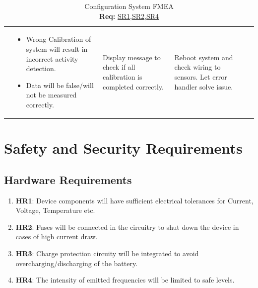 \documentclass{article}
\begin{document}
\begin{table}[H]
\begin{tabular}{|p{3em}|p{5em}|p{7em}|p{8em}|p{6em}|p{7em}|}
		 & \begin{itemize}[nosep, wide=0pt, leftmargin=*, after=\strut]
			   \item Wrong Calibration of system will result in incorrect activity detection.
			   \item Data will be false/will not be measured correctly.
		   \end{itemize}

		 & Display message to check if all calibration is completed correctly.
		 & Reboot system and check wiring to sensors. Let error handler solve issue. \tabularnewline\cline{1-6}

	\end{tabular}%
	\caption{\label{tab:Configuration}Configuration System FMEA \\\hspace{0.1\textwidth} \textbf{Req:} \hyperref[SR1]{SR1},\hyperref[SR2]{SR2},\hyperref[SR4]{SR4}}
	\end{table}



\section{Safety and Security Requirements}

\subsection{Hardware Requirements}
\begin{enumerate}
	\item\label{HR1}\textbf{HR1}: Device components will have sufficient electrical tolerances for Current, Voltage, Temperature etc.\\
	\item\label{HR2}\textbf{HR2}: Fuses will be connected in the circuitry to shut down the device in cases of high current draw.\\
	\item\label{HR3}\textbf{HR3}: Charge protection circuity will be integrated to avoid overcharging/discharging of the battery.\\
	\item\label{HR4}\textbf{HR4}: The intensity of emitted frequencies will be limited to safe levels.\\
\end{enumerate}
\end{document}
